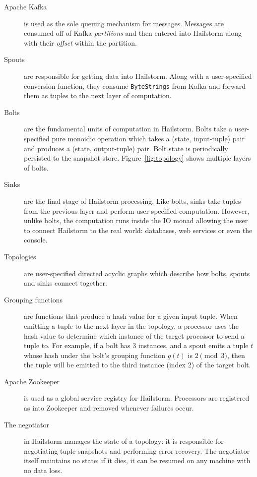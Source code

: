 \documentclass[10pt,nocopyrightspace]{sigplanconf}
\begin{document}
\begin{description}
\item[Apache Kafka] is used as the sole queuing mechanism for
  messages. Messages are consumed off of Kafka \textit{partitions} and then
  entered into Hailstorm along with their \textit{offset} within the
  partition.

\item[Spouts] are responsible for getting data into Hailstorm. Along
  with a user-specified conversion function, they consume \lstinline{ByteStrings}
  from Kafka and forward them as tuples to the next layer of computation.

\item[Bolts] are the fundamental units of computation in Hailstorm.
  Bolts take a user-specified pure monoidic operation which takes a (state, input-tuple)
  pair and produces a (state, output-tuple) pair. Bolt state is periodically
  persisted to the snapshot store. Figure~\ref{fig:topology} shows multiple
  layers of bolts.

\item[Sinks] are the final stage of Hailstorm processing. Like bolts,
  sinks take tuples from the previous layer and perform user-specified computation.
  However, unlike bolts, the computation runs inside the IO monad allowing the
  user to connect Hailstorm to the real world: databases, web services or even the
  console.

\item[Topologies] are user-specified directed acyclic graphs which
  describe how bolts, spouts and sinks connect together.

\item[Grouping functions] are functions that produce a hash value for a
given input tuple. When emitting a tuple to the next layer in the topology, a
processor uses the hash value to determine which instance of the target
processor to send a tuple to. For example, if a bolt has 3 instances, and a
spout emits a tuple $t$ whose hash under the bolt's grouping function $g(t)$ is
$2 \pmod 3$, then the tuple will be emitted to the third instance (index 2) of
the target bolt.

\item[Apache Zookeeper] is used as a global service registry for
  Hailstorm. Processors are registered as into Zookeeper and removed whenever
  failures occur.

\item[The negotiator] in Hailstorm manages the state of a topology: it is
  responsible for negotiating tuple snapshots and performing error recovery. The
  negotiator itself maintains no state: if it dies, it can be resumed on any
  machine with no data loss.
\end{description}
\end{document}

